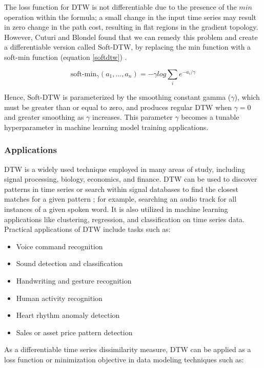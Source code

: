 \documentclass[12pt, letterpaper]{article}
\begin{document}
The loss function for DTW is not differentiable due to the presence of the $min$
operation within the formula; a small change in the input time series may result
in zero change in the path cost, resulting in flat regions in the gradient
topology. However, Cuturi and Blondel found that we can remedy this problem and
create a differentiable version called Soft-DTW, by replacing the min function
with a soft-min function (equation \ref{softdtw}) \cite{cuturi_soft-dtw_2018}.

\begin{equation} \label{softdtw}
\text{soft-min}_\gamma(a_1,...,a_n) = -\gamma log\sum_{i}e^{-a_i/\gamma}
\end{equation}

Hence, Soft-DTW is parameterized by the smoothing constant gamma ($\gamma$), which
must be greater than or equal to zero, and produces regular DTW when $\gamma = 0$ and
greater smoothing as $\gamma$ increases. This parameter $\gamma$ becomes a tunable
hyperparameter in machine learning model training applications.

\subsubsection{Applications}

DTW is a widely used technique employed in many areas of study, including signal
processing, biology, economics, and finance. DTW can be used to discover
patterns in time series or search within signal databases to find the closest
matches for a given pattern \cite{keogh_derivative_2001}; for example, searching
an audio track for all instances of a given spoken word. It is also utilized in
machine learning applications like clustering, regression, and classification on
time series data. Practical applications of DTW include tasks such as:

\begin{itemize}
    \item Voice command recognition
    \item Sound detection and classification
    \item Handwriting and gesture recognition
    \item Human activity recognition
    \item Heart rhythm anomaly detection
    \item Sales or asset price pattern detection
\end{itemize}

As a differentiable time series dissimilarity measure, DTW can be applied as a
loss function or minimization objective in data modeling techniques such as:
\end{document}
